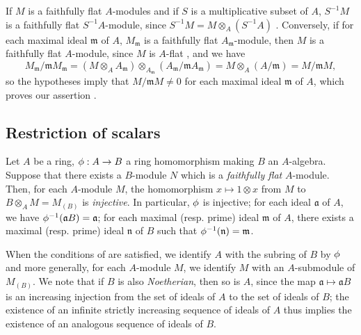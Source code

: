 \begin{env}[6.4.5]
\label{0.6.4.5}
If $M$ is a faithfully flat $A$-modules and if $S$ is a multiplicative subset of $A$,
$S^{-1}M$ is a faithfully flat $S^{-1}A$-module, since $S^{-1}M=M\otimes_A(S^{-1}A)$
. Conversely, if for each maximal ideal $\mathfrak{m}$ of $A$,
$M_\mathfrak{m}$ is a faithfully flat $A_\mathfrak{m}$-module, then $M$ is a faithfully flat
$A$-module, since $M$ is $A$-flat , and we have
\[
  M_\mathfrak{m}/\mathfrak{m}M_\mathfrak{m}
  =(M\otimes_A A_\mathfrak{m})
  \otimes_{A_\mathfrak{m}}(A_\mathfrak{m}/\mathfrak{m}A_\mathfrak{m})
  =M\otimes_A(A/\mathfrak{m})=M/\mathfrak{m}M,
\]
so the hypotheses imply that $M/\mathfrak{m}M\neq 0$ for each maximal ideal $\mathfrak{m}$ of
$A$, which proves our assertion .
\end{env}

\subsection{Restriction of scalars}
\label{subsection:0.6.5}

\begin{env}[6.5.1]
\label{0.6.5.1}
Let $A$ be a ring, $\vphi:A\to B$ a ring homomorphism making $B$ an $A$-algebra. Suppose that
there exists a $B$-module $N$ which is a \emph{faithfully flat} $A$-module. Then, for each
$A$-module $M$, the homomorphism $x\mapsto 1\otimes x$ from $M$ to $B\otimes_A M=M_{(B)}$ is
\emph{injective}. In particular, $\phi$ is injective; for each ideal $\mathfrak{a}$ of $A$,
we have $\phi^{-1}(\mathfrak{a}B)=\mathfrak{a}$; for each maximal (resp. prime) ideal
$\mathfrak{m}$ of $A$, there exists a maximal (resp. prime) ideal $\mathfrak{n}$ of $B$ such
that $\phi^{-1}(\mathfrak{n})=\mathfrak{m}$.
\end{env}

\begin{env}[6.5.2]
\label{0.6.5.2}
When the conditions of  are satisfied, we identify $A$ with the subring of
$B$ by $\phi$ and more generally, for each $A$-module $M$, we identify $M$ with an
$A$-submodule of $M_{(B)}$. We note that if $B$ is also \emph{Noetherian}, then so is $A$,
since the map $\mathfrak{a}\mapsto\mathfrak{a}B$ is an increasing injection from the set of
ideals of $A$ to the set of ideals of $B$; the existence of an infinite strictly increasing
sequence of ideals of $A$ thus implies the existence of an analogous sequence of ideals of
$B$.
\end{env}

